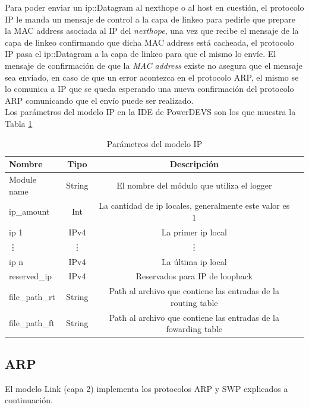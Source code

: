 \documentclass[10pt,a4paper]{article}
\begin{document}
Para poder enviar un ip::Datagram al nexthope o al host en cuestión, el protocolo IP le manda un mensaje de control a la capa de linkeo para pedirle que prepare la MAC address asociada al IP del \textit{nexthope}, una vez que recibe el mensaje de la capa de linkeo confirmando que dicha MAC address está cacheada, el protocolo IP pasa el ip::Datagram a la capa de linkeo para que el mismo lo envíe. El mensaje de confirmación de que la \textit{MAC address} existe no asegura que el mensaje sea enviado, en caso de que un error acontezca en el protocolo ARP, el mismo se lo comunica a IP que se queda esperando una nueva confirmación del protocolo ARP comunicando que el envío puede ser realizado. \\

Los parámetros del modelo IP en la IDE de PowerDEVS son los que muestra la Tabla \ref{table: patameters IP}

\begin{table}[h]
\begin{tabular}{|l|c|c|c|}
  \hline
  Nombre & Tipo & Descripción \\
  \hline
  Module name & String & El nombre del módulo que utiliza el logger \\
  \hline
  ip\_amount & Int & La cantidad de ip locales, generalmente este valor es 1 \\
  \hline
  ip 1 & IPv4 & La primer ip local \\
  \hline
  \vdots & \vdots & \vdots \\
  \hline
  ip n & IPv4 & La última ip local \\
  \hline
  reserved\_ip & IPv4 & Reservados para IP de loopback \\
  \hline
  file\_path\_rt & String & Path al archivo que contiene las entradas de la routing table \\
  \hline
  file\_path\_ft & String & Path al archivo que contiene las entradas de la fowarding table \\
  \hline
\end{tabular}
\label{table: patameters IP}
\caption{Parámetros del modelo IP}
\end{table}

\subsection{ARP}

El modelo Link (capa 2) implementa los protocolos ARP y SWP explicados a continuación. \\
\end{document}
